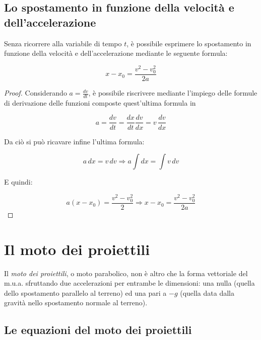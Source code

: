\documentclass[oneside]{book}
\begin{document}
\subsection{Lo spostamento in funzione della velocità e dell'accelerazione}

Senza ricorrere alla variabile di tempo $t$, è possibile
esprimere lo spostamento in funzione della velocità e dell'accelerazione
mediante le seguente formula:

\begin{equation}
    x-x_0=\frac{v^2-v_0^2}{2a}
\end{equation}

\begin{proof}

    Considerando $a=\frac{dv}{dt}$, è possibile riscrivere mediante l'impiego
    delle formule di derivazione delle funzioni composte quest'ultima formula in

    \begin{equation*}
        a=\frac{dv}{dt}=\frac{dx}{dt}\frac{dv}{dx}=v\,\frac{dv}{dx}
    \end{equation*}

    Da ciò si può ricavare infine l'ultima formula:

    \begin{equation*}
        a\,dx=v\,dv \Rightarrow a \int dx = \int v \, dv
    \end{equation*}

    E quindi:

    \begin{equation*}
        a(x-x_0)=\frac{v^2-v_0^2}{2} \Rightarrow x-x_0=\frac{v^2-v_0^2}{2a}
    \end{equation*}

\end{proof}

\section{Il moto dei proiettili}

Il \textit{moto dei proiettili}, o moto parabolico, non
è altro che la forma vettoriale del m.u.a. sfruttando due accelerazioni per
entrambe le dimensioni: una nulla (quella dello spostamento parallelo al
terreno) ed una pari a $-g$ (quella data dalla gravità nello spostamento
normale al terreno).

\subsection{Le equazioni del moto dei proiettili}
\end{document}
